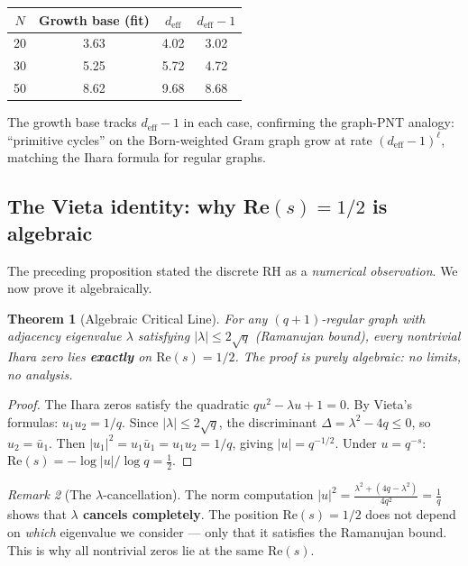 \documentclass[12pt]{article}
\newtheorem{theorem}{Theorem}[section]
\theoremstyle{definition}
\theoremstyle{remark}
\newtheorem{remark}[theorem]{Remark}
\begin{document}
\begin{center}
\begin{tabular}{cccc}
\toprule
$N$ & Growth base (fit) & $d_{\mathrm{eff}}$ & $d_{\mathrm{eff}} - 1$ \\
\midrule
20 & 3.63 & 4.02 & 3.02 \\
30 & 5.25 & 5.72 & 4.72 \\
50 & 8.62 & 9.68 & 8.68 \\
\bottomrule
\end{tabular}
\end{center}

\noindent
The growth base tracks $d_{\mathrm{eff}} - 1$ in each case,
confirming the graph-PNT analogy:
``primitive cycles'' on the Born-weighted Gram graph grow
at rate $(d_{\mathrm{eff}} - 1)^\ell$, matching the
Ihara formula for regular graphs.

\subsection{The Vieta identity: why Re$(s) = 1/2$ is algebraic}

The preceding proposition stated the discrete RH as a
\emph{numerical observation}.  We now prove it algebraically.

\begin{theorem}[Algebraic Critical Line]\label{thm:vieta}
For any $(q+1)$-regular graph with adjacency eigenvalue $\lambda$
satisfying $|\lambda| \leq 2\sqrt{q}$ (Ramanujan bound),
every nontrivial Ihara zero lies \textbf{exactly} on
$\mathrm{Re}(s) = 1/2$.  The proof is purely algebraic:
no limits, no analysis.
\end{theorem}

\begin{proof}
The Ihara zeros satisfy the quadratic
$qu^2 - \lambda u + 1 = 0$.
By Vieta's formulas: $u_1 u_2 = 1/q$.
Since $|\lambda| \leq 2\sqrt{q}$, the discriminant
$\Delta = \lambda^2 - 4q \leq 0$, so $u_2 = \bar{u}_1$.
Then $|u_1|^2 = u_1 \bar{u}_1 = u_1 u_2 = 1/q$,
giving $|u| = q^{-1/2}$.
Under $u = q^{-s}$:
$\mathrm{Re}(s) = -\log|u|/\log q = \tfrac{1}{2}$.
\end{proof}

\begin{remark}[The $\lambda$-cancellation]
The norm computation
$|u|^2 = \frac{\lambda^2 + (4q - \lambda^2)}{4q^2} = \frac{1}{q}$
shows that \textbf{$\lambda$ cancels completely}.
The position $\mathrm{Re}(s) = 1/2$ does not depend on
\emph{which} eigenvalue we consider --- only that it satisfies
the Ramanujan bound.  This is why all nontrivial zeros
lie at the same $\mathrm{Re}(s)$.
\end{remark}
\end{document}
